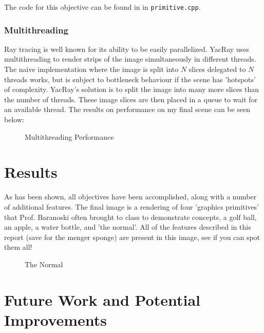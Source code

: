 \documentclass[12pt]{article}
\begin{document}
The code for this objective can be found in in \texttt{primitive.cpp}.

\subsubsection{Multithreading}

Ray tracing is well known for its ability to be easily parallelized. YacRay uses multithreading to render strips of the image simultaneously in different threads. The naive implementation where the image is split into $N$ slices delegated to $N$ threads works, but is subject to bottleneck behaviour if the scene has 'hotspots' of complexity. YacRay's solution is to split the image into many more slices than the number of threads. These image slices are then placed in a queue to wait for an available thread. The results on performance on my final scene can be seen below:

\begin{figure}[h]
\centering
{}
\caption{Multithreading Performance}
\label{Multithreading}
\end{figure}

\section{Results}

As has been shown, all objectives have been accomplished, along with a number of additional features. The final image is a rendering of four 'graphics primitives' that Prof. Baranoski often brought to class to demonstrate concepts, a golf ball, an apple, a water bottle, and 'the normal'. All of the features described in this report (save for the menger sponge) are present in this image, see if you can spot them all!

\begin{figure}[h]
\centering
{}
\caption{The Normal}
\label{Multithreading}
\end{figure}

\section{Future Work and Potential Improvements}
\end{document}
